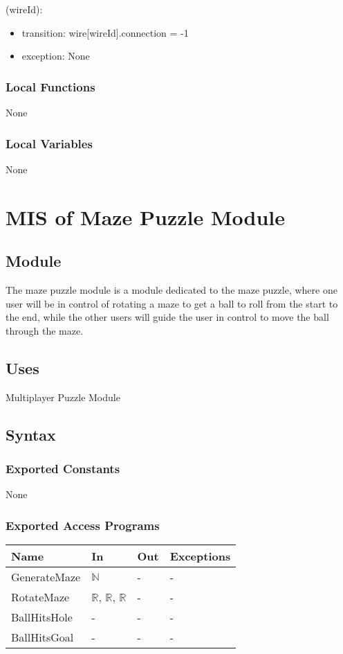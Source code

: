 \documentclass[12pt, titlepage]{article}
\begin{document}
(wireId):
\begin{itemize}
\item transition: wire[wireId].connection = -1
\item exception: None
\end{itemize}

\subsubsection{Local Functions}

None

\subsubsection{Local Variables}

None

\newpage

\section{MIS of Maze Puzzle Module} \label{MazeModule} 

\subsection{Module}

The maze puzzle module is a module dedicated to the maze puzzle, where one user will be in control of rotating a maze to get a ball to roll from the start to the end, while the other users will guide the user in control to move the ball through the maze. 

\subsection{Uses}
Multiplayer Puzzle Module
\subsection{Syntax}

\subsubsection{Exported Constants}
None
\subsubsection{Exported Access Programs}

\begin{center}
\begin{tabular}{p{3cm} p{4cm} p{4cm} p{2cm}}
\hline
\textbf{Name} & \textbf{In} & \textbf{Out} & \textbf{Exceptions} \\
\hline
GenerateMaze & $\mathbb{N}$ & - & - \\
RotateMaze & $\mathbb{R}$, $\mathbb{R}$, $\mathbb{R}$ & - & - \\
BallHitsHole & - & - & - \\
BallHitsGoal & - & - & - \\
\hline
\end{tabular}
\end{center}
\end{document}
